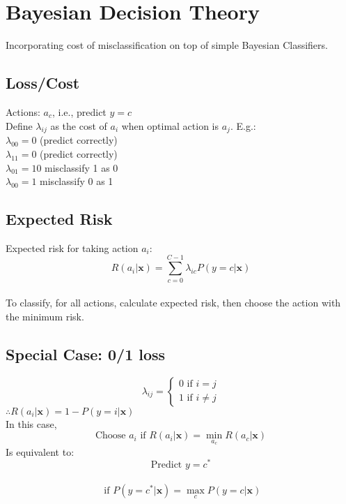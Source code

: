 \section{Bayesian Decision Theory}
Incorporating cost of misclassification on top of simple Bayesian Classifiers.
\subsection*{Loss/Cost}
Actions: $a_c$, i.e., predict $y=c$\\
Define $\lambda_{ij}$ as the cost of $a_i$ when optimal action is $a_j$. E.g.:\\
$\lambda_{00} = 0$ (predict correctly)\\
$\lambda_{11} = 0$ (predict correctly)\\
$\lambda_{01} = 10$ misclassify 1 as 0\\
$\lambda_{00} = 1$ misclassify 0 as 1\\
\subsection*{Expected Risk}
Expected risk for taking action $a_i$:\\
\[R(a_i|\mathbf{x}) = \sum^{C-1}_{c=0}\lambda_{ic}P(y=c|\mathbf{x})\]\\
To classify, for all actions, calculate expected risk, then choose the action 
with the minimum risk.
\subsection*{Special Case: 0/1 loss}
\[\lambda_{ij} = \begin{cases}
    0 \text{ if } i = j \\
    1 \text{ if } i \neq j
\end{cases}\]
$\therefore R(a_i|\mathbf{x}) = 1 - P(y=i|\mathbf{x})$\\
In this case,\\
\[\text{Choose } a_i \text{ if } R(a_i|\mathbf{x}) = \min_{a_c}R(a_c|\mathbf{x})\]
Is equivalent to:\\
\[\text{Predict } y = c^*\]\
\[ \text{ if } P(y=c^*|\mathbf{x}) = \max_{c}P(y=c|\mathbf{x})\]

